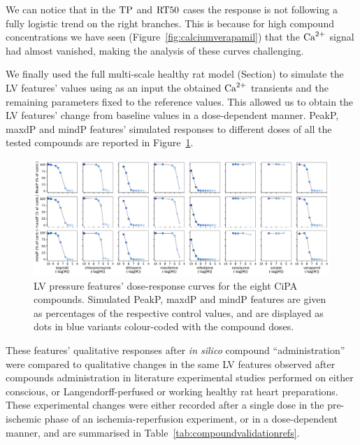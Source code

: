 \vspace{0.2cm}\noindent
We can notice that in the $\textrm{TP}$ and $\textrm{RT50}$ cases the response is not following a fully logistic trend on the right branches. This is because for high compound concentrations we have seen (Figure~\ref{fig:calciumverapamil}) that the $\textrm{Ca}^{2+}$ signal had almost vanished, making the analysis of these curves challenging.

\vspace{0.2cm}
We finally used the full multi-scale healthy rat model (Section) to simulate the LV features' values using as an input the obtained $\textrm{Ca}^{2+}$ transients and the remaining parameters fixed to the reference values. This allowed us to obtain the LV features' change from baseline values in a dose-dependent manner. PeakP, maxdP and mindP features' simulated responses to different doses of all the tested compounds are reported in Figure~\ref{fig:LVfeatsallcompoundsrespcurves}.

\begin{figure}[!ht]
    \myfloatalign
    \includegraphics[width=1\textwidth]{figures/chapter06/lvp_features_responses_to_all_drugs.pdf}
    \caption{LV pressure features' dose-response curves for the eight CiPA compounds. Simulated PeakP, maxdP and mindP features are given as percentages of the respective control values, and are displayed as dots in blue variants colour-coded with the compound doses.}
    \label{fig:LVfeatsallcompoundsrespcurves}
\end{figure}

\noindent
These features' qualitative responses after \textit{in silico} compound ``administration'' were compared to qualitative changes in the same LV features observed after compounds administration in literature experimental studies performed on either conscious, or Langendorff-perfused or working healthy rat heart preparations. These experimental changes were either recorded after a single dose in the pre-ischemic phase of an ischemia-reperfusion experiment, or in a dose-dependent manner, and are summarised in Table~\ref{tab:compoundvalidationrefs}.

